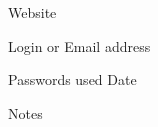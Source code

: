 \clearpage

\noindent Website \
\mypagerule
\vspace{0.4in}

\noindent Login or Email address \
\mypagerule
\vspace{0.4in}

\noindent Passwords used
\hspace{2.75in}
Date \
\mypagerule
\vspace{3in}

\noindent Notes \
\mypagerule
